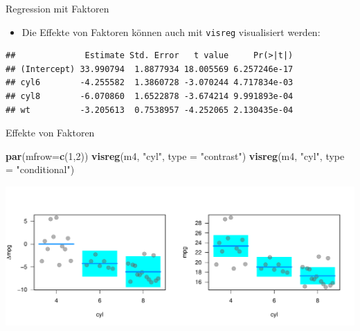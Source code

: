 \documentclass[ignorenonframetext,]{beamer}
\newenvironment{Shaded}{\begin{snugshade}}{\end{snugshade}}
\newcommand{\KeywordTok}[1]{\textcolor[rgb]{0.13,0.29,0.53}{\textbf{#1}}}
\newcommand{\DataTypeTok}[1]{\textcolor[rgb]{0.13,0.29,0.53}{#1}}
\newcommand{\DecValTok}[1]{\textcolor[rgb]{0.00,0.00,0.81}{#1}}
\newcommand{\StringTok}[1]{\textcolor[rgb]{0.31,0.60,0.02}{#1}}
\newcommand{\CommentTok}[1]{\textcolor[rgb]{0.56,0.35,0.01}{\textit{#1}}}
\newcommand{\OperatorTok}[1]{\textcolor[rgb]{0.81,0.36,0.00}{\textbf{#1}}}
\newcommand{\NormalTok}[1]{#1}
\providecommand{\tightlist}{%
  \setlength{\itemsep}{0pt}\setlength{\parskip}{0pt}}
\begin{document}
\begin{frame}[fragile]{Regression mit Faktoren}

\begin{itemize}
\tightlist
\item
  Die Effekte von Faktoren können auch mit \texttt{visreg} visualisiert
  werden:
\end{itemize}

\begin{Shaded}
\end{Shaded}

\begin{verbatim}
##              Estimate Std. Error   t value     Pr(>|t|)
## (Intercept) 33.990794  1.8877934 18.005569 6.257246e-17
## cyl6        -4.255582  1.3860728 -3.070244 4.717834e-03
## cyl8        -6.070860  1.6522878 -3.674214 9.991893e-04
## wt          -3.205613  0.7538957 -4.252065 2.130435e-04
\end{verbatim}

\end{frame}

\begin{frame}[fragile]{Effekte von Faktoren}

\begin{Shaded}
\begin{Highlighting}[]
\KeywordTok{par}\NormalTok{(}\DataTypeTok{mfrow=}\KeywordTok{c}\NormalTok{(}\DecValTok{1}\NormalTok{,}\DecValTok{2}\NormalTok{))}
\KeywordTok{visreg}\NormalTok{(m4, }\StringTok{"cyl"}\NormalTok{, }\DataTypeTok{type =} \StringTok{"contrast"}\NormalTok{)}
\KeywordTok{visreg}\NormalTok{(m4, }\StringTok{"cyl"}\NormalTok{, }\DataTypeTok{type =} \StringTok{"conditional"}\NormalTok{)}
\end{Highlighting}
\end{Shaded}

\includegraphics{B3_linreg_files/figure-beamer/unnamed-chunk-36-1.pdf}

\end{frame}
\end{document}
